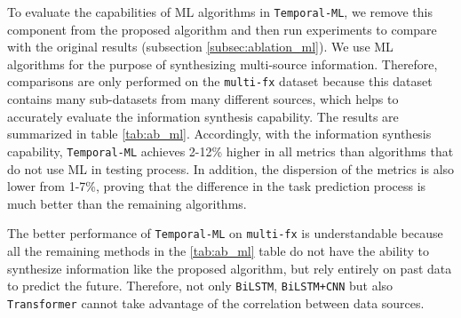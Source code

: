 
To evaluate the capabilities of ML algorithms in \verb|Temporal-ML|, we remove this component from the proposed algorithm and then run experiments to compare with the original results (subsection \ref{subsec:ablation_ml}). We use ML algorithms for the purpose of synthesizing multi-source information. Therefore, comparisons are only performed on the \verb|multi-fx| dataset because this dataset contains many sub-datasets from many different sources, which helps to accurately evaluate the information synthesis capability. The results are summarized in table \ref{tab:ab_ml}. Accordingly, with the information synthesis capability, \verb|Temporal-ML| achieves 2-12\% higher in all metrics than algorithms that do not use ML in testing process. In addition, the dispersion of the metrics is also lower from 1-7\%, proving that the difference in the task prediction process is much better than the remaining algorithms.


The better performance of \verb|Temporal-ML| on \verb|multi-fx| is understandable because all the remaining methods in the \ref{tab:ab_ml} table do not have the ability to synthesize information like the proposed algorithm, but rely entirely on past data to predict the future. Therefore, not only \verb|BiLSTM|, \verb|BiLSTM+CNN| but also \verb|Transformer| cannot take advantage of the correlation between data sources.

